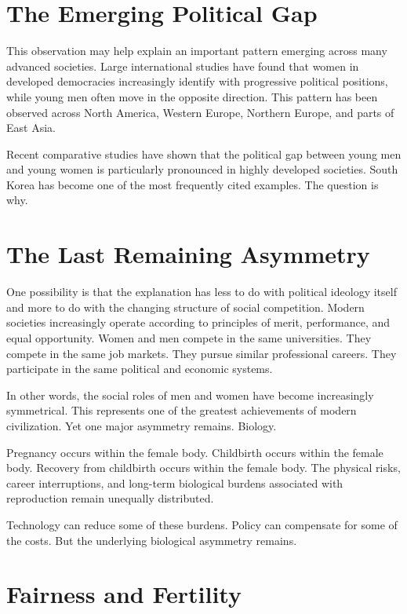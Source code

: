 \documentclass[12pt]{article}
\begin{document}
\section*{The Emerging Political Gap}

This observation may help explain an important pattern emerging across many advanced societies. Large international studies have found that women in developed democracies increasingly identify with progressive political positions, while young men often move in the opposite direction. This pattern has been observed across North America, Western Europe, Northern Europe, and parts of East Asia.

Recent comparative studies have shown that the political gap between young men and young women is particularly pronounced in highly developed societies. South Korea has become one of the most frequently cited examples. The question is why.

\section*{The Last Remaining Asymmetry}

One possibility is that the explanation has less to do with political ideology itself and more to do with the changing structure of social competition. Modern societies increasingly operate according to principles of merit, performance, and equal opportunity. Women and men compete in the same universities. They compete in the same job markets. They pursue similar professional careers. They participate in the same political and economic systems.

In other words, the social roles of men and women have become increasingly symmetrical. This represents one of the greatest achievements of modern civilization. Yet one major asymmetry remains. Biology.

Pregnancy occurs within the female body. Childbirth occurs within the female body. Recovery from childbirth occurs within the female body. The physical risks, career interruptions, and long-term biological burdens associated with reproduction remain unequally distributed.

Technology can reduce some of these burdens. Policy can compensate for some of the costs. But the underlying biological asymmetry remains.

\section*{Fairness and Fertility}
\end{document}
